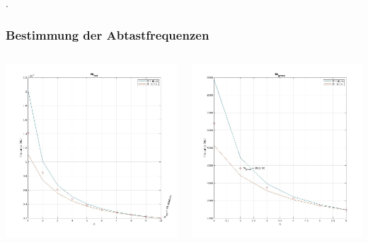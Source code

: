 \documentclass{beamer}
\begin{document}
\begin{frame}
.
  \frametitle{Bestimmung der Abtastfrequenzen}
  \begin{columns}
    \begin{column}{0.5\textwidth}
      \includegraphics[width=\textwidth, height=0.7\textheight]{images/fAred.jpg}
    \end{column}
    \begin{column}{0.5\textwidth}
      \includegraphics[width=\textwidth, height=0.7\textheight]{images/fAgreen.jpg}
    \end{column}
  \end{columns}
\end{frame}
\end{document}
